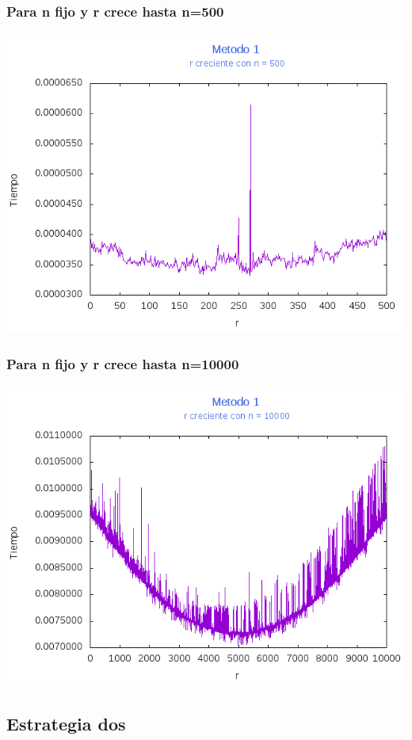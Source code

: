 \documentclass[12pt,letterpaper]{scrartcl}
\begin{document}
\subsubsection{Para n fijo y r crece hasta n=500}
\includegraphics[scale=1]{Metodo1/plot500m1}

\subsubsection{Para n fijo y r crece hasta n=10000}
\includegraphics[scale=1]{Metodo1/plot10000m1}
\newpage
\subsection{Estrategia dos}
\end{document}
